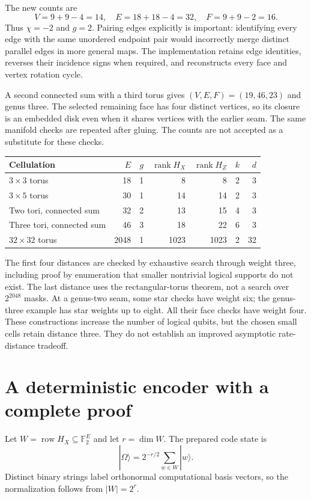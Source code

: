 The new counts are
\[
 V=9+9-4=14,\quad E=18+18-4=32,\quad F=9+9-2=16.
\]
Thus $\chi=-2$ and $g=2$.  Pairing edges explicitly is important:
identifying every edge with the same unordered endpoint pair would
incorrectly merge distinct parallel edges in more general maps.  The
implementation retains edge identities, reverses their incidence signs
when required, and reconstructs every face and vertex rotation cycle.

A second connected sum with a third torus gives
$(V,E,F)=(19,46,23)$ and genus three.  The selected remaining face has
four distinct vertices, so its closure is an embedded disk even when it
shares vertices with the earlier seam.  The same manifold checks are
repeated after gluing.  The counts are not accepted as a substitute for
these checks.

\begin{longtable}{lrrrrrr}
\toprule
Cellulation & $E$ & $g$ & $\operatorname{rank}H_X$ &
$\operatorname{rank}H_Z$ & $k$ & $d$\\\midrule
$3\times3$ torus &18&1&8&8&2&3\\
$3\times5$ torus &30&1&14&14&2&3\\
Two tori, connected sum &32&2&13&15&4&3\\
Three tori, connected sum &46&3&18&22&6&3\\
$32\times32$ torus &2048&1&1023&1023&2&32\\\bottomrule
\end{longtable}

The first four distances are checked by exhaustive search through weight
three, including proof by enumeration that smaller nontrivial logical
supports do not exist.  The last distance uses the rectangular-torus
theorem, not a search over $2^{2048}$ masks.  At a genus-two seam, some
star checks have weight six; the genus-three example has star weights up
to eight.  All their face checks have weight four.  These constructions
increase the number of logical qubits, but the chosen small cells retain
distance three.  They do not establish an improved asymptotic rate-distance
tradeoff.

\section{A deterministic encoder with a complete proof}

Let $W=\operatorname{row}H_X\subseteq\mathbb F_2^E$ and let
$r=\dim W$.  The prepared code state is
\begin{equation}
 |\Omega\rangle=2^{-r/2}\sum_{w\in W}|w\rangle.
 \label{eq:surface-encoded-state}
\end{equation}
Distinct binary strings label orthonormal computational basis vectors,
so the normalization follows from $|W|=2^r$.

